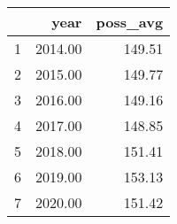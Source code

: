 \begin{table}[ht]
\centering
\begin{tabular}{rrr}
  \hline
 & year & poss\_avg \\ 
  \hline
1 & 2014.00 & 149.51 \\ 
  2 & 2015.00 & 149.77 \\ 
  3 & 2016.00 & 149.16 \\ 
  4 & 2017.00 & 148.85 \\ 
  5 & 2018.00 & 151.41 \\ 
  6 & 2019.00 & 153.13 \\ 
  7 & 2020.00 & 151.42 \\ 
   \hline
\end{tabular}
\end{table}
